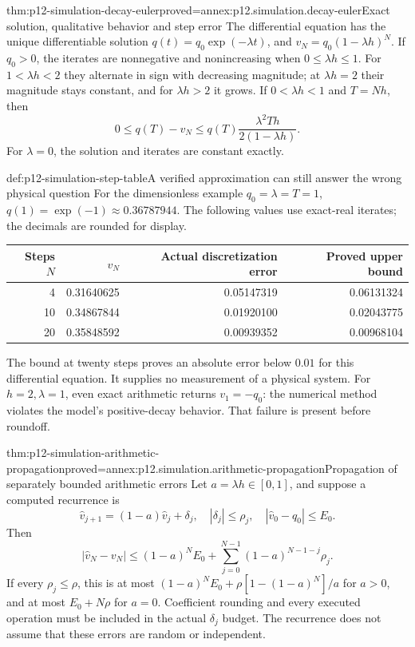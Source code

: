 \begin{hbtheorem}{thm:p12-simulation-decay-euler}{proved=annex:p12.simulation.decay-euler}{Exact solution, qualitative behavior and step error}
The differential equation has the unique differentiable solution
\(q(t)=q_0\exp(-\lambda t)\), and
\(v_N=q_0(1-\lambda h)^N\). If \(q_0>0\), the iterates are
nonnegative and nonincreasing when \(0\leq\lambda h\leq1\).
For \(1<\lambda h<2\) they alternate in sign with decreasing
magnitude; at \(\lambda h=2\) their magnitude stays constant,
and for \(\lambda h>2\) it grows.
If \(0<\lambda h<1\) and \(T=Nh\), then
\[
 0\leq q(T)-v_N\leq
 q(T)\frac{\lambda^2 T h}{2(1-\lambda h)}.
\]
For \(\lambda=0\), the solution and iterates are constant exactly.
\end{hbtheorem}

\begin{hbexample}{def:p12-simulation-step-table}{A verified approximation can still answer the wrong physical question}
For the dimensionless example \(q_0=\lambda=T=1\),
\(q(1)=\exp(-1)\approx0.36787944\). The following values use
exact-real iterates; the decimals are rounded for display.
\begin{center}
\begin{tabular}{rrrr}
\toprule
Steps \(N\)&\(v_N\)&Actual discretization error&Proved upper bound\\
\midrule
4 &0.31640625&0.05147319&0.06131324\\
10&0.34867844&0.01920100&0.02043775\\
20&0.35848592&0.00939352&0.00968104\\
\bottomrule
\end{tabular}
\end{center}
The bound at twenty steps proves an absolute error below \(0.01\)
for this differential equation. It supplies no measurement of a
physical system. For \(h=2,\lambda=1\), even exact arithmetic
returns \(v_1=-q_0\): the numerical method violates the model's
positive-decay behavior. That failure is present before roundoff.
\end{hbexample}

\begin{hbtheorem}{thm:p12-simulation-arithmetic-propagation}{proved=annex:p12.simulation.arithmetic-propagation}{Propagation of separately bounded arithmetic errors}
Let \(a=\lambda h\in[0,1]\), and suppose a computed recurrence is
\[
 \widehat v_{j+1}=(1-a)\widehat v_j+\delta_j,
 \quad |\delta_j|\leq\rho_j,\quad
 |\widehat v_0-q_0|\leq E_0.
\]
Then
\[
 |\widehat v_N-v_N|\leq
 (1-a)^N E_0+\sum_{j=0}^{N-1}(1-a)^{N-1-j}\rho_j.
\]
If every \(\rho_j\leq\rho\), this is at most
\((1-a)^N E_0+\rho[1-(1-a)^N]/a\) for \(a>0\),
and at most \(E_0+N\rho\) for \(a=0\).
Coefficient rounding and every executed operation must be included
in the actual \(\delta_j\) budget. The recurrence does not assume
that these errors are random or independent.
\end{hbtheorem}

